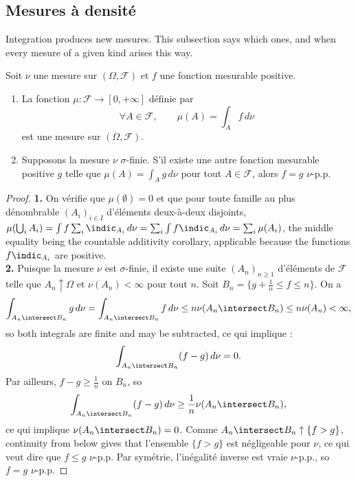 \subsection{Mesures à densité}

Integration produces new mesures. This subsection says which ones, and when every
mesure of a given kind arises this way.

\begin{theorem}
  Soit $\nu$ une mesure sur $(\Omega,\mathcal{F})$ et $f$ une fonction mesurable
  positive.
  \begin{enumerate}
    \item La fonction $\mu : \mathcal{F} \to [0,+\infty]$ définie par
      \[
        \forall A \in \mathcal{F}, \qquad \mu(A) = \int_{A} f \, d\nu
      \]
      est une mesure sur $(\Omega,\mathcal{F})$.
    \item Supposons la mesure $\nu$ $\sigma$-finie. S'il existe une autre fonction
      mesurable positive $g$ telle que $\mu(A) = \int_{A} g \, d\nu$ pour tout $A \in
      \mathcal{F}$, alors $f = g$ $\nu$-p.p.
  \end{enumerate}
\end{theorem}

\begin{proof}
  \textbf{1.} On vérifie que $\mu(\emptyset) = 0$ et que pour toute famille au plus
  dénombrable $(A_{i})_{i \in I}$ d'éléments deux-à-deux disjoints,
  $\mu(\bigcup_{i} A_{i}) = \int f \sum_{i} \indic_{A_{i}} \, d\nu = \sum_{i} \int f
  \indic_{A_{i}} \, d\nu = \sum_{i} \mu(A_{i})$, the middle equality being the
  countable additivity corollary, applicable because the functions $f
  \indic_{A_{i}}$ are positive.\\

  \textbf{2.} Puisque la mesure $\nu$ est $\sigma$-finie, il existe une suite
  $(A_{n})_{n \geq 1}$ d'éléments de $\mathcal{F}$ telle que $A_{n} \uparrow \Omega$
  et $\nu(A_{n}) < \infty$ pour tout $n$. Soit $B_{n} = \{g + \frac{1}{n} \leq f \leq
  n\}$. On a
  \[
    \int_{A_{n} \intersect B_{n}} g \, d\nu
    = \int_{A_{n} \intersect B_{n}} f \, d\nu
    \leq n \nu(A_{n} \intersect B_{n}) \leq n \nu(A_{n}) < \infty ,
  \]
  so both integrals are finite and may be subtracted, ce qui implique :
  \[
    \int_{A_{n} \intersect B_{n}} (f - g) \, d\nu = 0 .
  \]
  Par ailleurs, $f - g \geq \frac{1}{n}$ on $B_{n}$, so
  \[
    \int_{A_{n} \intersect B_{n}} (f - g) \, d\nu
    \geq \frac{1}{n} \nu(A_{n} \intersect B_{n}) ,
  \]
  ce qui implique $\nu(A_{n} \intersect B_{n}) = 0$. Comme $A_{n} \intersect B_{n}
  \uparrow \{f > g\}$, continuity from below gives that l'ensemble $\{f > g\}$ est
  négligeable pour $\nu$, ce qui veut dire que $f \leq g$ $\nu$-p.p. Par symétrie,
  l'inégalité inverse est vraie $\nu$-p.p., so $f = g$ $\nu$-p.p.
\end{proof}

